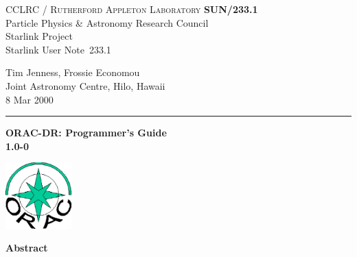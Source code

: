 \documentclass[twoside,11pt]{article}
\newcommand{\stardoccategory}  {Starlink User Note}
\newcommand{\stardocinitials}  {SUN}
\newcommand{\stardocnumber}    {233.1}
\newcommand{\stardocauthors}   {Tim Jenness, Frossie Economou\\
Joint Astronomy Centre, Hilo, Hawaii}
\newcommand{\stardocdate}      {8 Mar 2000}
\newcommand{\stardoctitle}     {ORAC-DR: Programmer's Guide}
\newcommand{\stardocversion}   {1.0-0}
\newcommand{\stardocmanual}    {}
\newcommand{\stardocname}{\stardocinitials /\stardocnumber}
\newenvironment{latexonly}{}{}
\renewcommand{\_}{\texttt{\symbol{95}}}
\begin{document}
\thispagestyle{empty}

\begin{latexonly}
   CCLRC / \textsc{Rutherford Appleton Laboratory} \hfill \textbf{\stardocname}\\
   {\large Particle Physics \& Astronomy Research Council}\\
   {\large Starlink Project\\}
   {\large \stardoccategory\ \stardocnumber}
   \begin{flushright}
   \stardocauthors\\
   \stardocdate
   \end{flushright}
   \vspace{-4mm}
   \rule{\textwidth}{0.5mm}
   \vspace{5mm}
   \begin{center}
   {\Huge\textbf{\stardoctitle \\ [2.5ex]}}
   {\LARGE\textbf{\stardocversion \\ [4ex]}}
   {\Huge\textbf{\stardocmanual}}
   \end{center}
   \vspace{5mm}

\begin{center}
\includegraphics[width=1.0in]{sun233_logo.eps}
\end{center}

   \vspace{10mm}
   \begin{center}
      {\Large\textbf{Abstract}}
   \end{center}
\end{latexonly}
\end{document}
